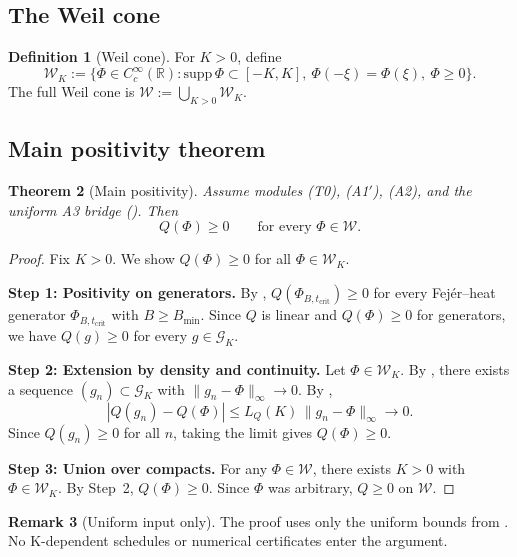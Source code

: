 \documentclass[11pt,a4paper]{article}
\newtheorem{theorem}{Theorem}[section]
\theoremstyle{definition}
\newtheorem{definition}[theorem]{Definition}
\newtheorem{remark}[theorem]{Remark}
\newcommand{\RR}{\mathbb{R}}
\newcommand{\WW}{\mathcal{W}}
\newcommand{\GG}{\mathcal{G}}
\begin{document}
\subsection{The Weil cone}

\begin{definition}[Weil cone]
For $K > 0$, define
\[
\WW_K := \{\Phi \in C^\infty_c(\RR) : \mathrm{supp}\,\Phi \subset [-K,K],\ \Phi(-\xi) = \Phi(\xi),\ \Phi \ge 0\}.
\]
The full Weil cone is $\WW := \bigcup_{K > 0} \WW_K$.
\end{definition}

\subsection{Main positivity theorem}

\begin{theorem}[Main positivity]\label{thm:main-positivity}
Assume modules \textup{(T0)}, \textup{(A1$'$)}, \textup{(A2)}, and the uniform A3 bridge (). Then
\[
Q(\Phi) \ge 0 \qquad \text{for every } \Phi \in \WW.
\]
\end{theorem}

\begin{proof}
Fix $K > 0$. We show $Q(\Phi) \ge 0$ for all $\Phi \in \WW_K$.

\textbf{Step 1: Positivity on generators.} By , $Q(\Phi_{B,t_{\mathrm{crit}}}) \ge 0$ for every Fej\'er--heat generator $\Phi_{B,t_{\mathrm{crit}}}$ with $B \ge B_{\min}$. Since $Q$ is linear and $Q(\Phi) \ge 0$ for generators, we have $Q(g) \ge 0$ for every $g \in \GG_K$.

\textbf{Step 2: Extension by density and continuity.} Let $\Phi \in \WW_K$. By , there exists a sequence $(g_n) \subset \GG_K$ with $\|g_n - \Phi\|_\infty \to 0$. By ,
\[
|Q(g_n) - Q(\Phi)| \le L_Q(K)\,\|g_n - \Phi\|_\infty \to 0.
\]
Since $Q(g_n) \ge 0$ for all $n$, taking the limit gives $Q(\Phi) \ge 0$.

\textbf{Step 3: Union over compacts.} For any $\Phi \in \WW$, there exists $K > 0$ with $\Phi \in \WW_K$. By Step~2, $Q(\Phi) \ge 0$. Since $\Phi$ was arbitrary, $Q \ge 0$ on $\WW$.
\end{proof}

\begin{remark}[Uniform input only]
The proof uses only the uniform bounds from . No K-dependent schedules or numerical certificates enter the argument.
\end{remark}
\end{document}
